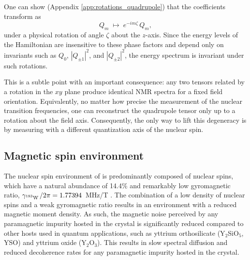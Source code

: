 One can show (Appendix \ref{app:rotations_quadrupole}) that the coefficients transform as 
\begin{equation}
Q_m \;\mapsto\; e^{-im\zeta}\, Q_m,
\end{equation}
under a physical rotation of angle $\zeta$ about the $z$-axis. Since the energy levels of the Hamiltonian are insensitive to these phase factors and depend only on invariants such as $Q_0$, $|Q_{\pm 1}|^2$, and $|Q_{\pm 2}|^2$, the energy spectrum is invariant under such rotations. 

This is a subtle point with an important consequence: any two tensors related by a rotation in the $xy$ plane produce identical NMR spectra for a fixed field orientation. Equivalently, no matter how precise the measurement of the nuclear transition frequencies, one can reconstruct the quadrupole tensor only up to a rotation about the field axis. Consequently, the only way to lift this degeneracy is by measuring with a different quantization axis of the nuclear spin.

\subsection{Magnetic spin environment}

The nuclear spin environment of \Ca is predominantly composed of \W nuclear spins, which have a natural abundance of 14.4\% and remarkably low gyromagnetic ratio, $\gamma_{\text{$^{183}$W\,}}/2\pi = 1.77394$~MHz/T . The combination of a low density of nuclear spins and a weak gyromagnetic ratio results in an environment with a reduced magnetic moment density.
As such, the magnetic noise perceived by any paramagnetic impurity hosted in the crystal is significantly reduced compared to other hosts used in quantum applications, such as yttrium orthosilicate (Y$_2$SiO$_5$, YSO) and yttrium oxide (Y$_2$O$_3$). This results in slow spectral diffusion and reduced decoherence rates for any paramagnetic impurity hosted in the crystal.

